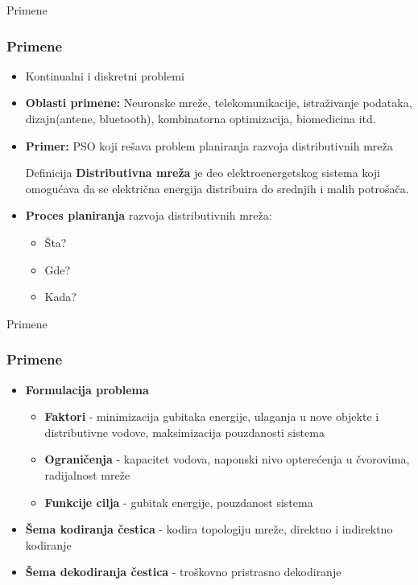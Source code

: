 \documentclass{beamer}
\begin{document}
\begin{frame}{Primene}

\frametitle{Primene}
\begin{itemize}
\item Kontinualni i diskretni problemi
\item \textbf{Oblasti primene:} Neuronske mreže, telekomunikacije, istraživanje podataka, dizajn(antene, bluetooth), kombinatorna optimizacija, biomedicina itd.
\item \textbf{Primer:} PSO koji rešava problem planiranja razvoja distributivnih mreža

\begin{block}{Definicija}
\textbf{Distributivna mreža} je deo elektroenergetskog sistema koji omogućava da se električna energija distribuira do srednjih i malih potrošača. 
\end{block}

\item \textbf{Proces planiranja} razvoja distributivnih mreža:
\begin{itemize}
    \item Šta?
    \item Gde? 
    \item Kada?
\end{itemize}

\end{itemize}


\end{frame}


\begin{frame}{Primene}

\frametitle{Primene}
\begin{itemize}
\item \textbf{Formulacija problema} 
\begin{itemize}
    \item \textbf{Faktori} - minimizacija gubitaka energije, ulaganja u nove objekte i distributivne vodove, maksimizacija pouzdanosti sistema
    \item \textbf{Ograničenja} - kapacitet vodova, naponski nivo opterećenja u čvorovima, radijalnost mreže
    \item \textbf{Funkcije cilja} - gubitak energije, pouzdanost sistema
\end{itemize}
\item \textbf{Šema kodiranja čestica} - kodira topologiju mreže, direktno i indirektno kodiranje
\item \textbf{Šema dekodiranja čestica} - troškovno pristrasno dekodiranje

\end{itemize}


\end{frame}
\end{document}
